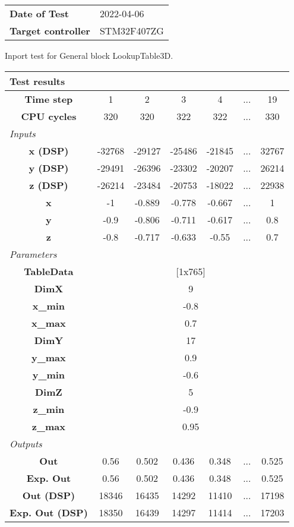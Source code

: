 \begin{tabular}{l l}
\textbf{Date of Test} & 2022-04-06 \tabularnewline
\textbf{Target controller} & STM32F407ZG \tabularnewline
\end{tabular}
\vspace{1ex}
Inport test for General block LookupTable3D.

\vspace{1em}
\begin{tabularx}{\textwidth}{|c|c|c|c|c|>{\centering\arraybackslash}X|c|}
\hline
\multicolumn{7}{|l|}{\cellcolor[gray]{0.8}\textbf{Test results}} \tabularnewline \hline
\textbf{Time step} & 1 & 2 & 3 & 4 & ... & 19 \tabularnewline \hline
\textbf{CPU cycles} & 320 & 320 & 322 & 322 & ... & 330 \tabularnewline \hline
\multicolumn{7}{|l|}{\cellcolor[gray]{0.9}\textit{Inputs}} \tabularnewline \hline
\textbf{x (DSP)} & -32768 & -29127 & -25486 & -21845 & ... & 32767 \tabularnewline \hline
\textbf{y (DSP)} & -29491 & -26396 & -23302 & -20207 & ... & 26214 \tabularnewline \hline
\textbf{z (DSP)} & -26214 & -23484 & -20753 & -18022 & ... & 22938 \tabularnewline \hline
\textbf{x} & -1 & -0.889 & -0.778 & -0.667 & ... & 1 \tabularnewline \hline
\textbf{y} & -0.9 & -0.806 & -0.711 & -0.617 & ... & 0.8 \tabularnewline \hline
\textbf{z} & -0.8 & -0.717 & -0.633 & -0.55 & ... & 0.7 \tabularnewline \hline
\multicolumn{7}{|l|}{\cellcolor[gray]{0.9}\textit{Parameters}} \tabularnewline \hline
\textbf{TableData} & \multicolumn{6}{c|}{[1x765]} \tabularnewline \hline
\textbf{DimX} & \multicolumn{6}{c|}{9} \tabularnewline \hline
\textbf{x\_min} & \multicolumn{6}{c|}{-0.8} \tabularnewline \hline
\textbf{x\_max} & \multicolumn{6}{c|}{0.7} \tabularnewline \hline
\textbf{DimY} & \multicolumn{6}{c|}{17} \tabularnewline \hline
\textbf{y\_max} & \multicolumn{6}{c|}{0.9} \tabularnewline \hline
\textbf{y\_min} & \multicolumn{6}{c|}{-0.6} \tabularnewline \hline
\textbf{DimZ} & \multicolumn{6}{c|}{5} \tabularnewline \hline
\textbf{z\_min} & \multicolumn{6}{c|}{-0.9} \tabularnewline \hline
\textbf{z\_max} & \multicolumn{6}{c|}{0.95} \tabularnewline \hline
\multicolumn{7}{|l|}{\cellcolor[gray]{0.9}\textit{Outputs}} \tabularnewline \hline
\textbf{Out} & 0.56 & 0.502 & 0.436 & 0.348 & ... & 0.525 \tabularnewline \hline
\textbf{Exp. Out} & 0.56 & 0.502 & 0.436 & 0.348 & ... & 0.525 \tabularnewline \hline
\textbf{Out (DSP)} & 18346 & 16435 & 14292 & 11410 & ... & 17198 \tabularnewline \hline
\textbf{Exp. Out (DSP)} & 18350 & 16439 & 14297 & 11414 & ... & 17203 \tabularnewline \hline
\end{tabularx}
\vspace{1ex}

